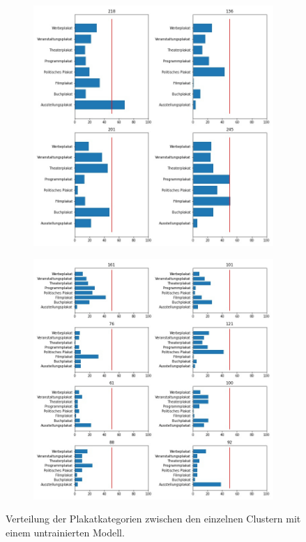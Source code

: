 \documentclass[a4paper,12pt,ngerman]{article}
\begin{document}
\newpage
\begin{landscape}
\begin{figure}[ht]
	\begin{subfigure}[b]{0.5\linewidth}
	\centering
	\includegraphics[height=\linewidth]{4_clusters_untrained}
	\end{subfigure}
	\begin{subfigure}[b]{0.5\linewidth}
	\centering
	\includegraphics[height=\linewidth]{8_clusters_untrained}
	\end{subfigure}
	\caption{Verteilung der Plakatkategorien zwischen den einzelnen Clustern mit einem untrainierten Modell.}
\end{figure}
\end{landscape}
\end{document}
